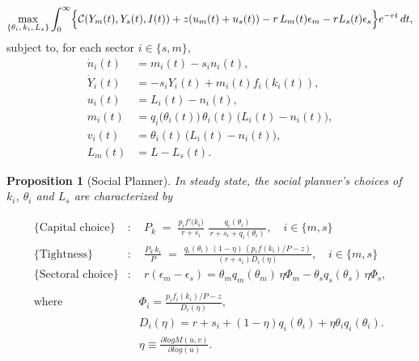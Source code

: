 \documentclass[12pt]{article} %
\newtheorem{proposition}{Proposition}
\theoremstyle{definition}
\begin{document}
\begin{align}
\max_{\{\theta_i,\,k_i,\,L_s\}}
\int_{0}^{\infty}
\Bigl\{
\mathcal{C}(Y_m(t), Y_s(t), I(t)) +z(u_m(t)+u_s(t))
- r\,L_m(t)\epsilon_m - rL_s(t)\epsilon_s
\Bigr\}
e^{-rt}\,dt,
\label{eq:SPP_AS_two_sectors_objective}
\end{align}
subject to, for each sector $i \in \{s,m\}$,
\begin{align}
    \dot{n}_i(t) & = m_i(t) - s_i n_i(t), \label{eq:ni_law_motion}\\
        \dot{Y}_i(t) & = -s_iY_i(t) + m_i(t)f_i(k_i(t)), \\
        u_i(t) &= L_i(t) - n_i(t), \\
    m_i(t) & = q_i\bigl(\theta_i(t)\bigr)\,\theta_i(t)\,\bigl(L_i(t) - n_i(t)\bigr), \label{eq:mi_def}\\
    v_i(t) & = \theta_i(t)\,\bigl(L_i(t) - n_i(t)\bigr), \label{eq:vi_def}\\
    L_m(t) & = L - L_s(t).
\end{align}


\begin{proposition}[Social Planner]
\label{prop:SPP}
In steady state, the social planner's choices of $k_i$, $\theta_i$ and $L_s$ are characterized by

\begin{align}
\{\text{Capital choice}\}&: \quad P_k \;=\; \frac{p_i f'\bigl(k_i\bigr)}{r+s_i}\;\frac{q_i(\theta_i)}{\,r+s_i + q_i(\theta_i)\,}, \quad i\in \{m,s\}   \label{eq:SPP_capital_condition_boxed} \\
\{ \text{Tightness} \}&: \quad \frac{P_k\,k_i}{P}
\;=\;
\frac{q_i(\theta_i)\,(1-\eta)\,(p_i f(k_i)/P-z)}{(r+s_i)D_i(\eta)},  \quad i\in \{m,s\}  \label{eq:SPP_theta_condition_boxed}  \\
\{\text{Sectoral choice}\}&: \quad  r(\epsilon_m-\epsilon_s)
=\theta_m q_m(\theta_m)\,\eta \Phi_m - \theta_s q_s(\theta_s)\,\eta \Phi_s,\label{eq:SPP_Ls_condition_boxed}\\
\nonumber \\
\text{where} & \quad 
    \Phi_i = \frac{p_if_i(k_i)/P-z}{D_i(\eta)},  \label{eq:Phi}\\
   & \quad D_i(\eta) = r+s_i + (1-\eta) q_i(\theta_i) + \eta \theta_i q_i(\theta_i).\\
   & \quad \eta \equiv \frac{\partial log M(u,v)}{\partial log (u)}. %
\end{align}

\end{proposition}
\end{document}
